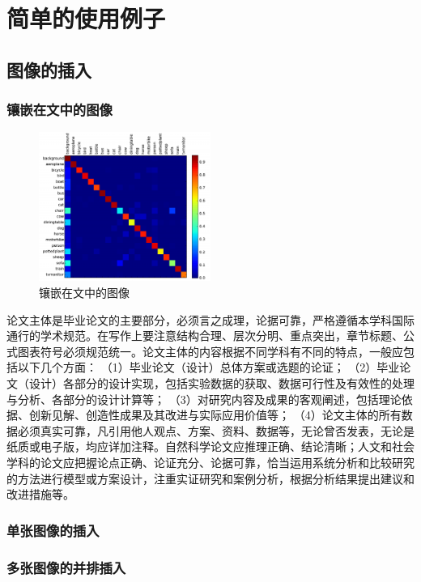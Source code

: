 \chapter{简单的使用例子}
\label{cha:example}
\section{图像的插入}
\subsection{镶嵌在文中的图像}
\label{sec:Images}
\begin{figure}
	\centering
	\includegraphics[width=0.5\textwidth]{image/result/confusion.pdf}
	\caption{镶嵌在文中的图像}
	\label{fig:confusion}
\end{figure}
论文主体是毕业论文的主要部分，必须言之成理，论据可靠，严格遵循本学科国际通行的学术规范。在写作上要注意结构合理、层次分明、重点突出，章节标题、公式图表符号必须规范统一。论文主体的内容根据不同学科有不同的特点，一般应包括以下几个方面： （1）毕业论文（设计）总体方案或选题的论证； （2）毕业论文（设计）各部分的设计实现，包括实验数据的获取、数据可行性及有效性的处理与分析、各部分的设计计算等； （3）对研究内容及成果的客观阐述，包括理论依据、创新见解、创造性成果及其改进与实际应用价值等； （4）论文主体的所有数据必须真实可靠，凡引用他人观点、方案、资料、数据等，无论曾否发表，无论是纸质或电子版，均应详加注释。自然科学论文应推理正确、结论清晰；人文和社会学科的论文应把握论点正确、论证充分、论据可靠，恰当运用系统分析和比较研究的方法进行模型或方案设计，注重实证研究和案例分析，根据分析结果提出建议和改进措施等。
\subsection{单张图像的插入}


\subsection{多张图像的并排插入}
\label{sub:多张图像的并排插入}



